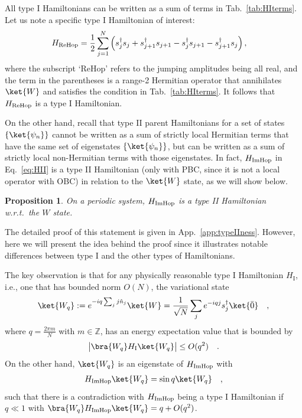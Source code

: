\documentclass[prx,letterpaper,aps,superscriptaddress,floatfix,twocolumn,nofootinbib]{revtex4-2}
\newtheorem{prop}{Proposition}
\theoremstyle{definition}
\newcommand{\ktW}{\ket{W}}
\begin{document}
%
All type I Hamiltonians can be written as a sum of terms in Tab.~\ref{tab:HIterms}.
%
Let us note a specific type I Hamiltonian of interest:
\begin{align}
    H_{\rm ReHop}&=\frac{1}{2}\sum_{j=1}^N \left(s_j^\dag s_j+s_{j+1}^\dag s_{j+1}-s_j^\dag s_{j+1}-s_{j+1}^\dag s_j\right),
    \label{eq:HI}
\end{align}
where the subscript `ReHop' refers to the jumping amplitudes being all real, and the term in the parentheses is a range-2 Hermitian operator that annihilates $\ket{W}$ and satisfies the condition in Tab.~\ref{tab:HIterms}.
%
It follows that $H_{\rm ReHop}$ is a type I Hamiltonian.
%

%
On the other hand, recall that type II parent Hamiltonians for a set of states $\{\ket{\psi_n}\}$ cannot be written as a sum of strictly local Hermitian terms that have the same set of eigenstates $\{\ket{\psi_n}\}$, but can be written as a sum of strictly local non-Hermitian terms with those eigenstates.
%
In fact, $H_{\rm ImHop}$ in Eq.~\eqref{eq:HII} is a type II Hamiltonian (only with PBC, since it is not a local operator with OBC) in relation to the $\ket{W}$ state, as we will show below.
\begin{prop}
\label{prop:HII}
On a periodic system, $H_{\rm ImHop}$ is a type II Hamiltonian w.r.t.\ the $W$ state.
\end{prop}
The detailed proof of this statement is given in App.~\ref{app:typeIIness}.
%
However, here we will present the idea behind the proof since it illustrates notable differences between type I and the other types of Hamiltonians. 
%

%
The key observation is that for any physically reasonable type I Hamiltonian $H_\text{I}$, i.e., one that has bounded norm $O(N)$, the variational state
\begin{equation}
    \ket{W_q}:= e^{-i q \sum_j j \hat{n}_j} \ktW = \frac{1}{\sqrt{N}} \sum_j e^{-i q j} s_j^\dagger \ket{\bar{0}}\quad,
    \label{eq:Wqboost}
\end{equation}
where $q=\frac{2\pi m}{N}$ with $m\in\mathbb{Z}$, has an energy expectation value that is bounded by
\begin{equation}
    \big|\bra{W_q}H_{\rm I} \ket{W_q} \big| \leq O(q^2)\quad.
\end{equation}
On the other hand, $\ket{W_q}$ is an eigenstate of $H_{\rm ImHop}$ with
\begin{align}
    H_{\rm ImHop}\ket{W_q}= \sin q\ket{W_q}\quad,
\end{align}
such that there is a contradiction with $H_{\rm ImHop}$ being a type I Hamiltonian if $q\ll 1$ with $\bra{W_q}H_{\rm ImHop}\ket{W_q}=q+O(q^2)$.
%
\end{document}
